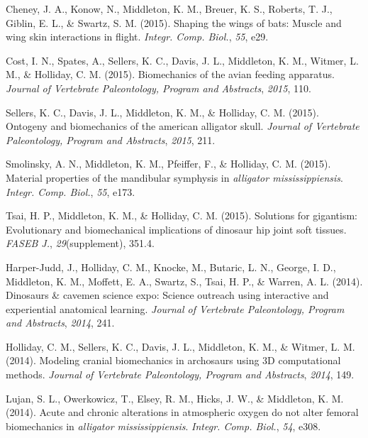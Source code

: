 \documentclass[11pt, a4paper]{awesome-cv}
\begin{document}
\leavevmode\hypertarget{ref-cheney_shaping_2015}{}%
Cheney, J. A., Konow, N., Middleton, K. M., Breuer, K. S., Roberts, T.
J., Giblin, E. L., \& Swartz, S. M. (2015). Shaping the wings of bats:
Muscle and wing skin interactions in flight. \emph{Integr. Comp. Biol.},
\emph{55}, e29.

\leavevmode\hypertarget{ref-cost_biomechanics_2015}{}%
Cost, I. N., Spates, A., Sellers, K. C., Davis, J. L., Middleton, K. M.,
Witmer, L. M., \& Holliday, C. M. (2015). Biomechanics of the avian
feeding apparatus. \emph{Journal of Vertebrate Paleontology, Program and
Abstracts}, \emph{2015}, 110.

\leavevmode\hypertarget{ref-sellers_ontogeny_2015}{}%
Sellers, K. C., Davis, J. L., Middleton, K. M., \& Holliday, C. M.
(2015). Ontogeny and biomechanics of the american alligator skull.
\emph{Journal of Vertebrate Paleontology, Program and Abstracts},
\emph{2015}, 211.

\leavevmode\hypertarget{ref-smolinsky_material_2015}{}%
Smolinsky, A. N., Middleton, K. M., Pfeiffer, F., \& Holliday, C. M.
(2015). Material properties of the mandibular symphysis in
\emph{alligator mississippiensis}. \emph{Integr. Comp. Biol.},
\emph{55}, e173.

\leavevmode\hypertarget{ref-tsai_solutions_2015}{}%
Tsai, H. P., Middleton, K. M., \& Holliday, C. M. (2015). Solutions for
gigantism: Evolutionary and biomechanical implications of dinosaur hip
joint soft tissues. \emph{FASEB J.}, \emph{29}(supplement), 351.4.

\leavevmode\hypertarget{ref-harper-judd_dinosaurs_2014}{}%
Harper-Judd, J., Holliday, C. M., Knocke, M., Butaric, L. N., George, I.
D., Middleton, K. M., Moffett, E. A., Swartz, S., Tsai, H. P., \&
Warren, A. L. (2014). Dinosaurs \& cavemen science expo: Science
outreach using interactive and experiential anatomical learning.
\emph{Journal of Vertebrate Paleontology, Program and Abstracts},
\emph{2014}, 241.

\leavevmode\hypertarget{ref-holliday_modeling_2014}{}%
Holliday, C. M., Sellers, K. C., Davis, J. L., Middleton, K. M., \&
Witmer, L. M. (2014). Modeling cranial biomechanics in archosaurs using
3D computational methods. \emph{Journal of Vertebrate Paleontology,
Program and Abstracts}, \emph{2014}, 149.

\leavevmode\hypertarget{ref-lujan_acute_2014}{}%
Lujan, S. L., Owerkowicz, T., Elsey, R. M., Hicks, J. W., \& Middleton,
K. M. (2014). Acute and chronic alterations in atmospheric oxygen do not
alter femoral biomechanics in \emph{alligator mississippiensis}.
\emph{Integr. Comp. Biol.}, \emph{54}, e308.
\end{document}
